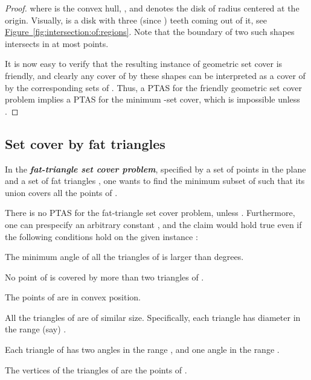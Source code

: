 \documentclass[12pt]{article}
\newcommand{\Term}[1]{\textsf{#1}}
\newcommand{\emphic}[2]{\textcolor{blue25}{\textbf{\emph{#1}}}\index{#2}}
\renewcommand{\emphic}[2]{\textbf{\emph{#1}}}
\newcommand{\emphi}[1]{\emphic{#1}{#1}}
\theoremstyle{remark}\theoremheaderfont{\sf}\theorembodyfont{\upshape}
\numberwithin{figure}{section}\numberwithin{table}{section}\numberwithin{equation}{section}
\newcommand{\HLink}[2]{\hyperref[#2]{#1~\ref*{#2}}}
\newcommand{\HLinkPage}[2]{\hyperref[#2]{#1~\ref*{#2}}}
\newcommand{\figref}[1]{\HLink{Figure}{fig:#1}}
\newcommand{\seclab}[1]{\label{sec:#1}} \newcommand{\secref}[1]{\HLink{Section}{sec:#1}} \newcommand{\secrefpage}[1]{\HLinkPage{Section}{sec:#1}}
\newcommand{\lemlab}[1]{\label{lemma:#1}}
\newcommand{\PTAS}{\Term{PTAS}\xspace}
\begin{document}
\begin{proof}
  where  is the convex hull,
  , and  denotes
  the disk of radius  centered at the origin. Visually, 
  is a disk with three (since ) teeth coming out of it, see
  \figref{intersection:of:regions}. Note that the boundary of two such
  shapes intersects in at most  points.

  It is now easy to verify that the resulting instance of geometric
  set cover  is
  friendly, and clearly any cover of  by these shapes can be
  interpreted as a cover of  by the corresponding sets of
  . Thus, a \PTAS for the friendly geometric set cover
  problem implies a \PTAS for the minimum -set cover, which is
  impossible unless .
\end{proof}


\subsection{Set cover by fat triangles}
\seclab{hardness-set-cover-fat-triangles}



In the \emphi{fat-triangle set cover problem}, specified by a set of
points in the plane  and a set of fat triangles ,
one wants to find the minimum subset of  such that its union
covers all the points of .

\begin{lemma}
  \lemlab{no:PTAS:fat:tr:set:cover}There is no \PTAS for the fat-triangle set cover problem, unless
  .  Furthermore, one can prespecify an arbitrary constant
  , and the claim would hold true even if the following
  conditions hold on the given instance :
  \begin{compactenum}[\quad(A)]
  \item The minimum angle of all the triangles of  is larger
    than  degrees.

  \item No point of  is covered by more than two triangles of
    .

  \item The points of  are in convex position.

  \item All the triangles of  are of similar
    size. Specifically, each triangle has diameter in the range (say)
    .

  \item Each triangle of  has two angles in the range
    , and one angle in the range
    .

  \item The vertices of the triangles of  are the points of
    .
  \end{compactenum}
\end{lemma}
\end{document}
